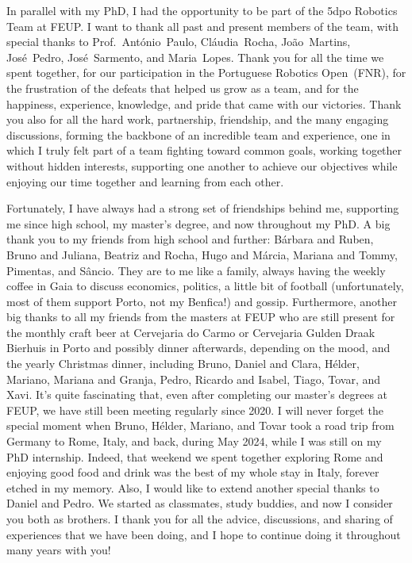 In parallel with my PhD, I had the opportunity to be part of the 5dpo Robotics
Team at FEUP. I want to thank all past and present members of the team, with
special thanks to Prof.~António~Paulo, Cláudia~Rocha,
João~Martins, José~Pedro, José~Sarmento,
and Maria~Lopes. Thank you for all the time we spent together, for our
participation in the Portuguese Robotics Open~(FNR), for the frustration of the
defeats that helped us grow as a team, and for the happiness, experience,
knowledge, and pride that came with our victories. Thank you also for all the
hard work, partnership, friendship, and the many engaging discussions, forming
the backbone of an incredible team and experience, one in which I truly felt
part of a team fighting toward common goals, working together without hidden
interests, supporting one another to achieve our objectives while enjoying our
time together and learning from each other.

Fortunately, I have always had a strong set of friendships behind me, supporting
me since high school, my master's degree, and now throughout my PhD. A big thank
you to my friends from high school and further: Bárbara and Ruben, Bruno and
Juliana, Beatriz and Rocha, Hugo and Márcia, Mariana and Tommy, Pimentas, and
Sâncio. They are to me like a family, always having the weekly coffee in Gaia
to discuss economics, politics, a little bit of football (unfortunately, most of
them support Porto, not my Benfica!) and gossip. Furthermore, another big thanks
to all my friends from the masters at FEUP who are still present for the monthly
craft beer at Cervejaria do Carmo or Cervejaria Gulden Draak Bierhuis in Porto
and possibly dinner afterwards, depending on the mood, and the yearly Christmas
dinner, including Bruno, Daniel and Clara, Hélder, Mariano, Mariana and Granja,
Pedro, Ricardo and Isabel, Tiago, Tovar, and Xavi. It's quite fascinating that,
even after completing our master's degrees at FEUP, we have still been meeting
regularly since 2020. I will never forget the special moment when Bruno, Hélder,
Mariano, and Tovar took a road trip from Germany to Rome, Italy, and back,
during May 2024, while I was still on my PhD internship. Indeed, that weekend we
spent together exploring Rome and enjoying good food and drink was the best of
my whole stay in Italy, forever etched in my memory. Also, I would like to
extend another special thanks to Daniel and Pedro. We started as classmates,
study buddies, and now I consider you both as brothers. I thank you for all the
advice, discussions, and sharing of experiences that we have been doing, and I
hope to continue doing it throughout many years with you!

